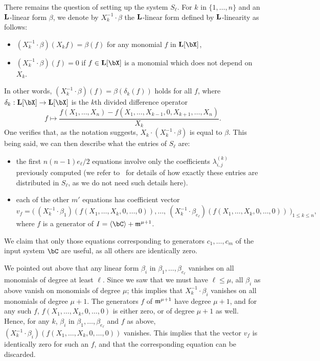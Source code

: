 \documentclass[12pt]{article}
\begin{document}
There remains the question of setting up the system $S_\ell$. For $k$
in $\{1,\dots,n\}$ and an $\mathbf{L}$-linear form $\beta$, we denote by
$X_k^{-1} \cdot \beta$ the $\mathbf{L}$-linear form defined by $\mathbf{L}$-linearity as follows:
\begin{itemize}
\item $(X_k^{-1} \cdot \beta)(X_k f) = \beta(f)$ for any monomial $f$ in $\LL[\bX]$,
\item $(X_k^{-1} \cdot \beta)(f)=0$ if $f\in \LL[\bX]$ is a monomial which does not depend on $X_k$.
\end{itemize}
In other words,
$(X_k^{-1} \cdot \beta)(f)=\beta(\delta_k(f))$ holds for all $f$,
where $\delta_k:\LL[\bX] \to \LL[\bX]$ is the $k$th divided difference
operator
$$f\mapsto \frac
{f(X_1,\dots,X_n)-f(X_1,\dots,X_{k-1},0,X_{k+1},\dots,X_n)}{X_k}.$$
One verifies that, as the notation suggests, $X_k \cdot (X_k^{-1}
\cdot \beta)$ is equal to $\beta$. This being said, we can then
describe what the entries of $S_\ell$ are:
\begin{itemize}
\item the first $n(n-1) e_\ell/2$ equations involve only the coefficients 
  $\lambda^{(k)}_{i,j}$ previously computed (we refer to~\cite[Section~4.4]{Mourrain97} for details of how exactly 
these entries are distributed in $S_\ell$, as we do not need such details here).
\item each of the other $m'$ equations has coefficient vector
$$v_f = \big (\
 (X_k^{-1} \cdot \beta_1)(f(X_1,\dots,X_k,0,\dots,0)),\dots,\ (X_k^{-1} \cdot \beta_{e_\ell})(f(X_1,\dots,X_k,0,\dots,0))\
\big )_{1 \le k \le n},$$
where $f$ is a generator of $I=\langle \bC \rangle +\m^{\mu+1}$.
\end{itemize}
We claim that only those equations corresponding to generators
$c_1,\dots,c_m$ of the input system $\bC$ are useful, as all others are identically
zero.

We pointed out above that any linear form $\beta_i$ in
$\beta_1,\dots,\beta_{e_\ell}$ vanishes on all monomials of degree at
least $\ell$. Since we saw that we must have $\ell \le \mu$, all
$\beta_i$ as above vanish on monomials of degree $\mu$; this implies
that $X_k^{-1}\cdot \beta_i$ vanishes on all monomials of degree
$\mu+1$. The generators $f$ of $\mathfrak{m}^{\mu+1}$ have degree $\mu+1$, and
for any such $f$, $f(X_1,\dots,X_k,0,\dots,0)$ is either zero, or of
degree $\mu+1$ as well. Hence, for any $k$, $\beta_i$ in
$\beta_1,\dots,\beta_{e_\ell}$ and $f$ as above, $(X_k^{-1} \cdot
\beta_i)(f(X_1,\dots,X_k,0,\dots,0))$ vanishes. This implies that the
vector $v_f$ is identically zero for such an $f$, and that the
corresponding equation can be discarded.
\end{document}
